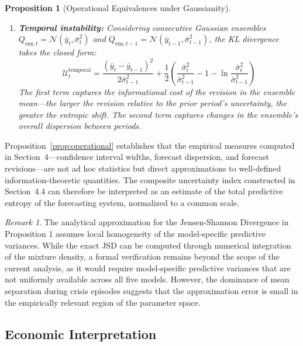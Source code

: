 \documentclass[12pt,a4paper]{article}
\newtheorem{proposition}{Proposition}
\theoremstyle{remark}
\newtheorem{remark}{Remark}
\begin{document}
\begin{proposition}[Operational Equivalences under Gaussianity]
\begin{enumerate}[label=(\roman*)]
    \item \textbf{Temporal instability:} Considering consecutive Gaussian
    ensembles $Q_{\text{ens},t} = \mathcal{N}(\bar{y}_t, \bar{\sigma}_t^2)$
    and $Q_{\text{ens},t-1} = \mathcal{N}(\bar{y}_{t-1},
    \bar{\sigma}_{t-1}^2)$, the KL divergence takes the closed form:
    \begin{equation}
        \mathcal{U}^{\text{temporal}}_t =
        \frac{(\bar{y}_t - \bar{y}_{t-1})^2}{2\bar{\sigma}_{t-1}^2}
        + \frac{1}{2}\left(\frac{\bar{\sigma}_t^2}{\bar{\sigma}_{t-1}^2}
        - 1 - \ln\frac{\bar{\sigma}_t^2}{\bar{\sigma}_{t-1}^2}\right)
        \label{eq:temporal_gaussian}
    \end{equation}
    The first term captures the informational cost of the revision in the
    ensemble mean—the larger the revision relative to the prior period's
    uncertainty, the greater the entropic shift. The second term captures
    changes in the ensemble's overall dispersion between periods.
\end{enumerate}
\end{proposition}

Proposition~\ref{prop:operational} establishes that the empirical measures
computed in Section~4—confidence interval widths, forecast dispersion, and
forecast revisions—are not ad hoc statistics but direct approximations to
well-defined information-theoretic quantities. The composite uncertainty
index constructed in Section~4.4 can therefore be interpreted as an
estimate of the total predictive entropy of the forecasting system,
normalized to a common scale.

\begin{remark}
The analytical approximation for the Jensen-Shannon Divergence in Proposition 1 assumes local homogeneity of the model-specific predictive variances. While the exact JSD can be computed through numerical integration of the mixture density, a formal verification remains beyond the scope of the current analysis, as it would require model-specific predictive variances that are not uniformly available across all five models. However, the dominance of mean separation during crisis episodes suggests that the approximation error is small in the empirically relevant region of the parameter space.
\end{remark}

\subsection{Economic Interpretation}
\end{document}
